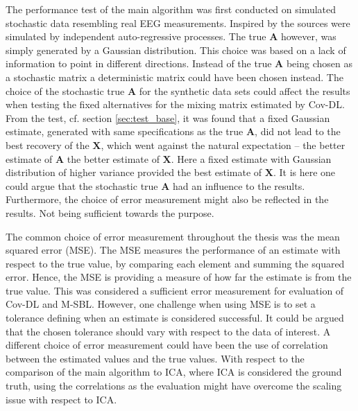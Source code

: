 The performance test of the main algorithm was first conducted on simulated stochastic data resembling real EEG measurements. 
Inspired by \cite{Balkan2015} the sources were simulated by independent auto-regressive processes. 
The true $\mathbf{A}$ however, was simply generated by a Gaussian distribution. 
This choice was based on a lack of information to point in different directions. 
Instead of the true $\mathbf{A}$ being chosen as a stochastic matrix a deterministic matrix could have been chosen instead. 
The choice of the stochastic true $\mathbf{A}$ for the synthetic data sets could affect the results when testing the fixed alternatives for the mixing matrix estimated by Cov-DL. 
From the test, cf. section \ref{sec:test_base}, it was found that a fixed Gaussian estimate, generated with same specifications as the true $\mathbf{A}$, did not lead to the best recovery of the $\mathbf{X}$, which went against the natural expectation -- the better estimate of $\mathbf{A}$ the better estimate of $\mathbf{X}$. 
Here a fixed estimate with Gaussian distribution of higher variance provided the best estimate of $\mathbf{X}$. 
It is here one could argue that the stochastic true $\mathbf{A}$ had an influence to the results. 
Furthermore, the choice of error measurement might also be reflected in the results. Not being sufficient towards the purpose. 

The common choice of error measurement throughout the thesis was the mean squared error (MSE). 
The MSE measures the performance of an estimate with respect to the true value, by comparing each element and summing the squared error. 
Hence, the MSE is providing a measure of how far the estimate is from the true value. 
This was considered a sufficient error measurement for evaluation of Cov-DL and M-SBL.
However, one challenge when using MSE is to set a tolerance defining when an estimate is considered successful. 
It could be argued that the chosen tolerance should vary with respect to the data of interest.
A different choice of error measurement could have been the use of correlation between the estimated values and the true values. With respect to the comparison of the main algorithm to ICA, where ICA is considered the ground truth, using the correlations as the evaluation might have overcome the scaling issue with respect to ICA.    

